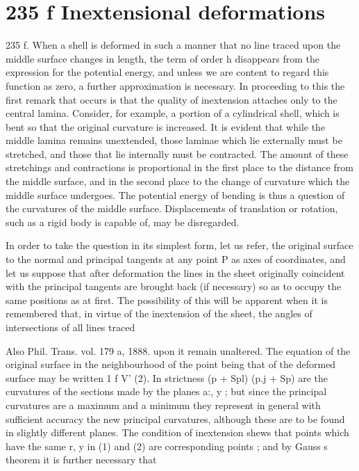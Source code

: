 \section{235 f Inextensional deformations}
235 f. When a shell is deformed in such a manner that no line traced upon the
middle surface changes in length, the term of order h disappears from the
expression for the potential energy, and unless we are content to regard this
function as zero, a further approximation is necessary. In proceeding to this
the first remark that occurs is that the quality of inextension attaches only
to the central lamina. Consider, for example, a portion of a cylindrical shell,
which is bent so that the original curvature is increased.  It is evident that
while the middle lamina remains unextended, those laminae which lie externally
must be stretched, and those that lie internally must be contracted. The amount
of these stretchings and contractions is proportional in the first place to the
distance from the middle surface, and in the second place to the change of
curvature which the middle surface undergoes. The potential energy of bending
is thus a question of the curvatures of the middle surface. Displacements of
translation or rotation, such as a rigid body is capable of, may be disregarded.

In order to take the question in its simplest form, let us refer, the original
surface to the normal and principal tangents at any point P as axes of
coordinates, and let us suppose that after deformation the lines in the sheet
originally coincident with the principal tangents are brought back
(if necessary) so as to occupy the same positions as at first. The possibility of
this will be apparent when it is remembered that, in virtue of the inextension
of the sheet, the angles of intersections of all lines traced

 Also Phil. Trans. vol. 179 a, 1888.  upon it remain unaltered. The equation of
the original surface in the neighbourhood of the point being that of the
deformed surface may be written 1 f V' (2).  In strictness (p + Spl)
(p.j + Sp) are the curvatures of the sections made by the planes a:, y ; but since the
principal curvatures are a maximum and a minimum they represent in general
with sufficient accuracy the new principal curvatures, although these are to be
found in slightly different planes. The condition of inextension shews that
points which have the same r, y in (1) and (2) are corresponding points ; and
by Gauss s theorem it is further necessary that

